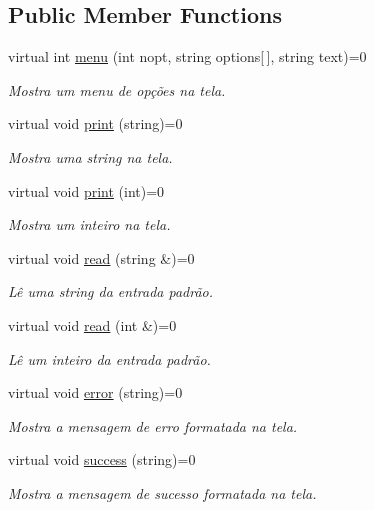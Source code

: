 \subsection*{Public Member Functions}
\begin{DoxyCompactItemize}
\item 
virtual int \hyperlink{classWindow_a3b6d7449c7f088f9ce59002573ca82c0}{menu} (int nopt, string options\mbox{[}$\,$\mbox{]}, string text)=0
\begin{DoxyCompactList}\small\item\em Mostra um menu de opções na tela. \end{DoxyCompactList}\item 
virtual void \hyperlink{classWindow_a4fd86bca046073b3429f221c2f3bb690}{print} (string)=0
\begin{DoxyCompactList}\small\item\em Mostra uma string na tela. \end{DoxyCompactList}\item 
virtual void \hyperlink{classWindow_aa0a1210e72a63332e49722f1f878ea94}{print} (int)=0
\begin{DoxyCompactList}\small\item\em Mostra um inteiro na tela. \end{DoxyCompactList}\item 
virtual void \hyperlink{classWindow_abb59602c637907250fd70b1450b85c5c}{read} (string \&)=0
\begin{DoxyCompactList}\small\item\em Lê uma string da entrada padrão. \end{DoxyCompactList}\item 
virtual void \hyperlink{classWindow_ab00a4c057aade6ddc2a4bb22b2a6de42}{read} (int \&)=0
\begin{DoxyCompactList}\small\item\em Lê um inteiro da entrada padrão. \end{DoxyCompactList}\item 
virtual void \hyperlink{classWindow_a2e661d42cd6e7b9c737530f4e34c87f1}{error} (string)=0
\begin{DoxyCompactList}\small\item\em Mostra a mensagem de erro formatada na tela. \end{DoxyCompactList}\item 
virtual void \hyperlink{classWindow_af625e87e68e0510c2fc11f1dc2d42f0e}{success} (string)=0
\begin{DoxyCompactList}\small\item\em Mostra a mensagem de sucesso formatada na tela. \end{DoxyCompactList}\end{DoxyCompactItemize}


